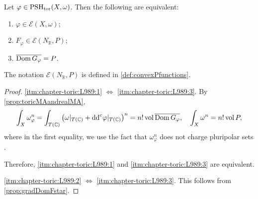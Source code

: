 \begin{proposition}\label{prop:toric-ample:L1003}
    Let $\varphi\in \mathrm{PSH}_{\mathrm{tor}}(X,\omega)$. Then the following are equivalent:
    \begin{enumerate}
        \item\label{itm:chapter-toric:L989:1} $\varphi\in \mathcal{E}(X,\omega)$;
        \item\label{itm:chapter-toric:L989:2} $F_{\varphi}\in \mathcal{E}(N_{\mathbb{R}},P)$;
        \item\label{itm:chapter-toric:L989:3} $\overline{\operatorname{Dom} G_{\varphi}}=P$.
    \end{enumerate}
\end{proposition}
The notation $\mathcal{E}(N_{\mathbb{R}},P)$ is defined in \cref{def:convexPfunctions}.
\begin{proof}
\ref{itm:chapter-toric:L989:1} $\iff$ \ref{itm:chapter-toric:L989:3}. By \cref{prop:toricMAandrealMA},
    \[
        \int_X \omega_{\varphi}^n=\int_{T(\mathbb{C})} \left(\omega|_{T(\mathbb{C})}+\mathrm{dd}^{\mathrm{c}} \varphi|_{T(\mathbb{C})} \right)^n= n! \operatorname{vol}\overline {\operatorname{Dom} G_{\varphi}},\quad \int_X \omega^n=n!\operatorname{vol} P,
    \]
    where in the first equality, we use the fact that $\omega_{\varphi}^n$ does not charge pluripolar sets .

    Therefore, \ref{itm:chapter-toric:L989:1} and \ref{itm:chapter-toric:L989:3} are equivalent.

\ref{itm:chapter-toric:L989:2} $\iff$ \ref{itm:chapter-toric:L989:3}. This follows from \cref{prop:gradDomFstar}.
\end{proof}

